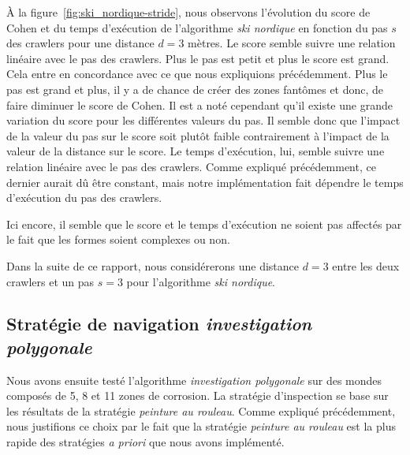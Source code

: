 \documentclass[francais,RandD]{rapportPFE}
\begin{document}
			À la figure~\ref{fig:ski_nordique-stride}, nous observons l'évolution du score de Cohen et du temps d'exécution de l'algorithme \textit{ski nordique} en fonction du pas $s$ des crawlers pour une distance $d = 3$ mètres.
			Le score semble suivre une relation linéaire avec le pas des crawlers.
			Plus le pas est petit et plus le score est grand.
			Cela entre en concordance avec ce que nous expliquions précédemment.
			Plus le pas est grand et plus, il y a de chance de créer des zones fantômes et donc, de faire diminuer le score de Cohen.
			Il est a noté cependant qu'il existe une grande variation du score pour les différentes valeurs du pas.
			Il semble donc que l'impact de la valeur du pas sur le score soit plutôt faible contrairement à l'impact de la valeur de la distance sur le score.
			Le temps d'exécution, lui, semble suivre une relation linéaire avec le pas des crawlers.
			Comme expliqué précédemment, ce dernier aurait dû être constant, mais notre implémentation fait dépendre le temps d'exécution du pas des crawlers.

			Ici encore, il semble que le score et le temps d'exécution ne soient pas affectés par le fait que les formes soient complexes ou non.

			Dans la suite de ce rapport, nous considérerons une distance $d = 3$ entre les deux crawlers et un pas $s = 3$ pour l'algorithme \textit{ski nordique}.
		\subsection*{Stratégie de navigation \textit{investigation polygonale}}
			Nous avons ensuite testé l'algorithme \textit{investigation polygonale} sur des mondes composés de 5, 8 et 11 zones de corrosion.
			La stratégie d'inspection se base sur les résultats de la stratégie \textit{peinture au rouleau}.
			Comme expliqué précédemment, nous justifions ce choix par le fait que la stratégie \textit{peinture au rouleau} est la plus rapide des stratégies \textit{a priori} que nous avons implémenté.
\end{document}
